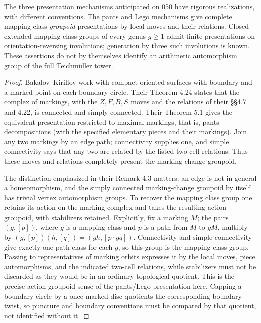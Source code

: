 \begin{proposition}\label{A6-presentation-types}
The three presentation mechanisms anticipated on 050 have rigorous realizations, with different conventions. The pants and Lego mechanisms give complete mapping-class \emph{groupoid} presentations by local moves and their relations. Closed extended mapping class groups of every genus $g\ge1$ admit finite presentations on orientation-reversing involutions; generation by three such involutions is known. These assertions do not by themselves identify an arithmetic automorphism group of the full Teichm\"uller tower.
\end{proposition}
\begin{proof}
Bakalov--Kirillov work with compact oriented surfaces with boundary and a marked point on each boundary circle. Their Theorem 4.24 \cite{BakalovKirillov2000A567} states that the complex of markings, with the $Z,F,B,S$ moves and the relations of their \S\S4.7 and 4.22, is connected and simply connected. Their Theorem 5.1 gives the equivalent presentation restricted to maximal markings, that is, pants decompositions (with the specified elementary pieces and their markings). Join any two markings by an edge path; connectivity supplies one, and simple connectivity says that any two are related by the listed two-cell relations. Thus these moves and relations completely present the marking-change groupoid.

The distinction emphasized in their Remark 4.3 matters: an edge is not in general a homeomorphism, and the simply connected marking-change groupoid by itself has trivial vertex automorphism groups. To recover the mapping class group one retains its action on the marking complex and takes the resulting action groupoid, with stabilizers retained. Explicitly, fix a marking $M$; the pairs $(g,[p])$, where $g$ is a mapping class and $p$ is a path from $M$ to $gM$, multiply by $(g,[p])(h,[q])=(gh,[p\cdot gq])$. Connectivity and simple connectivity give exactly one path class for each $g$, so this group is the mapping class group. Passing to representatives of marking orbits expresses it by the local moves, piece automorphisms, and the indicated two-cell relations, while stabilizers must not be discarded as they would be in an ordinary topological quotient. This is the precise action-groupoid sense of the pants/Lego presentation here. Capping a boundary circle by a once-marked disc quotients the corresponding boundary twist, so puncture and boundary conventions must be compared by that quotient, not identified without it.


\end{proof}
